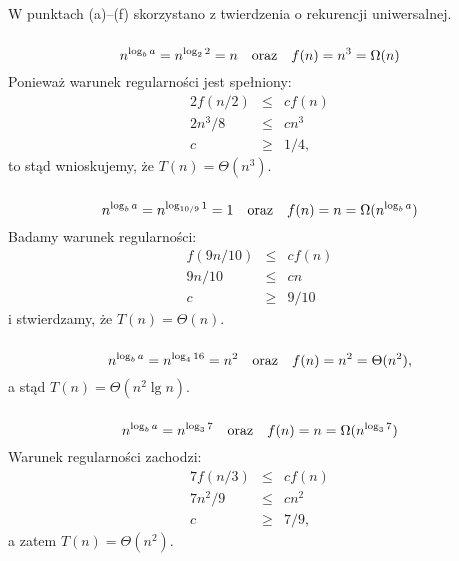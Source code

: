 \problems

\subsection{} %
W punktach (a)--(f) skorzystano z twierdzenia o rekurencji uniwersalnej.

\subsubsection{} %
\[
	n^{\log_ba} = n^{\log_22} = n \quad\hbox{oraz}\quad f(n) = n^3 = \Omega(n)
\]
Ponieważ warunek regularności jest spełniony:
\begin{eqnarray*}
	2f(n/2) &\le& cf(n) \\
	2n^3\!/8 &\le& cn^3 \\
	c &\ge& 1/4,
\end{eqnarray*}
to stąd wnioskujemy, że $T(n)=\Theta(n^3)$.

\subsubsection{} %
\[
	n^{\log_ba} = n^{\log_{10/9}1} = 1 \quad\hbox{oraz}\quad f(n) = n = \Omega(n^{\log_ba})
\]
Badamy warunek regularności:
\begin{eqnarray*}
	f(9n/10) &\le& cf(n) \\
	9n/10 &\le& cn \\
	c &\ge& 9/10
\end{eqnarray*}
i stwierdzamy, że $T(n)=\Theta(n)$.

\subsubsection{} %
\[
	n^{\log_ba} = n^{\log_416} = n^2 \quad\hbox{oraz}\quad f(n) = n^2 = \Theta(n^2),
\]
a stąd $T(n)=\Theta(n^2\lg n)$.

\subsubsection{} %
\[
	n^{\log_ba} = n^{\log_37} \quad\hbox{oraz}\quad f(n) = n = \Omega(n^{\log_37})
\]
Warunek regularności zachodzi:
\begin{eqnarray*}
	7f(n/3) &\le& cf(n) \\
	7n^2\!/9 &\le& cn^2 \\
	c &\ge& 7/9,
\end{eqnarray*}
a zatem $T(n)=\Theta(n^2)$.

